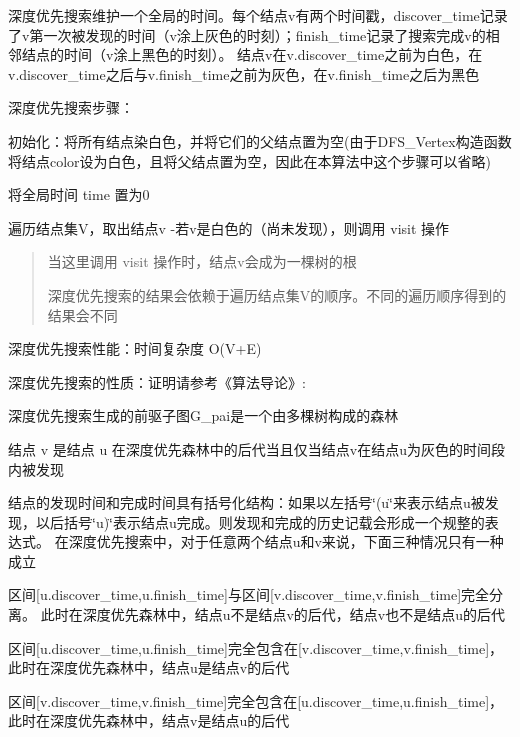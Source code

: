 深度优先搜索维护一个全局的时间。每个结点v有两个时间戳，discover\+\_\+time记录了v第一次被发现的时间（v涂上灰色的时刻）；finish\+\_\+time记录了搜索完成v的相邻结点的时间（v涂上黑色的时刻）。 结点v在v.\+discover\+\_\+time之前为白色，在v.\+discover\+\_\+time之后与v.\+finish\+\_\+time之前为灰色，在v.\+finish\+\_\+time之后为黑色

深度优先搜索步骤：


\begin{DoxyItemize}
\item 初始化：将所有结点染白色，并将它们的父结点置为空(由于\+D\+F\+S\+\_\+\+Vertex构造函数将结点color设为白色，且将父结点置为空，因此在本算法中这个步骤可以省略)
\item 将全局时间 time 置为0
\item 遍历结点集\+V，取出结点v -\/若v是白色的（尚未发现），则调用 visit 操作 \begin{quote}
当这里调用 visit 操作时，结点v会成为一棵树的根

深度优先搜索的结果会依赖于遍历结点集\+V的顺序。不同的遍历顺序得到的结果会不同 \end{quote}

\end{DoxyItemize}

深度优先搜索性能：时间复杂度 O(V+\+E)

深度优先搜索的性质：证明请参考《算法导论》\+:


\begin{DoxyItemize}
\item 深度优先搜索生成的前驱子图\+G\+\_\+pai是一个由多棵树构成的森林
\item 结点 v 是结点 u 在深度优先森林中的后代当且仅当结点v在结点u为灰色的时间段内被发现
\item 结点的发现时间和完成时间具有括号化结构：如果以左括号\char`\"{}(u\char`\"{}来表示结点u被发现，以后括号\char`\"{}u)\char`\"{}表示结点u完成。则发现和完成的历史记载会形成一个规整的表达式。 在深度优先搜索中，对于任意两个结点u和v来说，下面三种情况只有一种成立
\begin{DoxyItemize}
\item 区间\mbox{[}u.\+discover\+\_\+time,u.\+finish\+\_\+time\mbox{]}与区间\mbox{[}v.\+discover\+\_\+time,v.\+finish\+\_\+time\mbox{]}完全分离。 此时在深度优先森林中，结点u不是结点v的后代，结点v也不是结点u的后代
\item 区间\mbox{[}u.\+discover\+\_\+time,u.\+finish\+\_\+time\mbox{]}完全包含在\mbox{[}v.\+discover\+\_\+time,v.\+finish\+\_\+time\mbox{]}，此时在深度优先森林中，结点u是结点v的后代
\item 区间\mbox{[}v.\+discover\+\_\+time,v.\+finish\+\_\+time\mbox{]}完全包含在\mbox{[}u.\+discover\+\_\+time,u.\+finish\+\_\+time\mbox{]}，此时在深度优先森林中，结点v是结点u的后代
\end{DoxyItemize}
\end{DoxyItemize}

